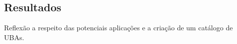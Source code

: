 \begin{partbacktext}
\part{Resultados}
\noindent Reflexão a respeito das potenciais aplicações e a criação de um catálogo de UBAs.
\end{partbacktext}
